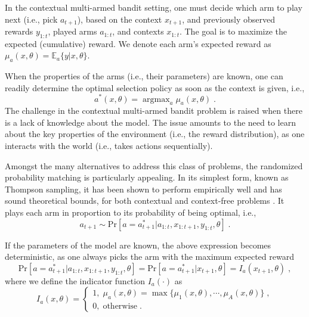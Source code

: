 \documentclass{article}
\newcommand{\ie}{i.e., }
\newcommand{\argmax}{\mathop{\mathrm{argmax}}}
\begin{document}
In the contextual multi-armed bandit setting, one must decide which arm to play next (\ie pick $a_{t+1}$), based on the context $x_{t+1}$, and previously observed rewards $y_{1:t}$, played arms $a_{1:t}$, and contexts $x_{1:t}$. The goal is to maximize the expected (cumulative) reward. We denote each arm's expected reward as $\mu_{a}(x,\theta)=\mathbb{E}_{a}\{y|x,\theta\}$. 

When the properties of the arms (\ie their parameters) are known, one can readily determine the optimal selection policy as soon as the context is given, \ie
\begin{equation}
a^*(x,\theta)=\argmax_{a}\mu_{a}(x,\theta) \; .
\end{equation}
The challenge in the contextual multi-armed bandit problem is raised when there is a lack of knowledge about the model. The issue amounts to the need to learn about the key properties of the environment (\ie the reward distribution), as one interacts with the world (\ie takes actions sequentially).

Amongst the many alternatives to address this class of problems, the randomized probability matching is particularly appealing. In its simplest form, known as Thompson sampling, it has been shown to perform empirically well \cite{ic-Chapelle2011, j-Scott2015} and has sound theoretical bounds, for both contextual and context-free problems \cite{j-Agrawal2012,j-Agrawal2012a}. It plays each arm in proportion to its probability of being optimal, \ie
\begin{equation}
a_{t+1} \sim \mathrm{Pr}\left[a=a_{t+1}^*|a_{1:t}, x_{1:t+1}, y_{1:t}, \theta \right] \;.
\end{equation} 

If the parameters of the model are known, the above expression becomes deterministic, as one always picks the arm with the maximum expected reward
\begin{equation}
\mathrm{Pr}\left[a=a_{t+1}^*|a_{1:t}, x_{1:t+1}, y_{1:t},\theta \right] = \mathrm{Pr}\left[a=a_{t+1}^*|x_{t+1}, \theta \right] = I_a(x_{t+1},\theta) \;,
\label{eq:theta_known_pr_arm_optimal}
\end{equation}
where we define the indicator function $I_a(\cdot)$ as
\begin{equation}
I_a(x,\theta) = \begin{cases}
1, \; \mu_{a}(x,\theta)=\max\{\mu_1(x,\theta), \cdots, \mu_A(x,\theta)\} \;, \\
0, \; \text{otherwise} \;.
\end{cases}
\end{equation}
\end{document}
